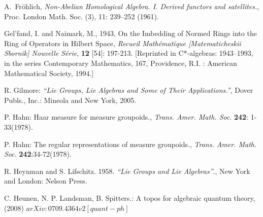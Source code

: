 \documentclass[12pt]{article}
\theoremstyle{plain}
\theoremstyle{definition}
\numberwithin{equation}{section}
\newcommand{\<}{{\langle}}
\begin{document}
\begin{thebibliography}{9}
A.~Fr{\"o}hlich, {\em Non-Abelian Homological Algebra. {I}.
{D}erived functors and satellites.\/}, Proc. London Math. Soc. (3), 11: 239--252 (1961).


Gel'fand, I. and Naimark, M., 1943, On the Imbedding of Normed Rings into the Ring of
Operators in Hilbert Space, {\em Recueil Math\'ematique [Matematicheskii Sbornik] Nouvelle S\'erie}, 
\textbf{12} [54]: 197-213. [Reprinted in C*-algebras: 1943--1993, in the series Contemporary 
Mathematics, 167,  Providence, R.I. : American Mathematical Society, 1994.]

R. Gilmore: \textit{``Lie Groups, Lie Algebras and Some of Their Applications.''},
Dover Publs., Inc.: Mineola and New York, 2005.

P. Hahn: Haar measure for measure groupoids., \textit{Trans. Amer. Math. Soc}. \textbf{242}: 1-33(1978).

P. Hahn: The regular representations of measure groupoids., \textit{Trans. Amer. Math. Soc}. \textbf{242}:34-72(1978).

R. Heynman and S. Lifschitz. 1958. \emph{``Lie Groups and Lie Algebras''}., New York and London: Nelson Press.

C. Heunen, N. P. Landsman, B. Spitters.: A topos for algebraic quantum theory, (2008) $arXiv:0709.4364v2 [quant-ph]$

\end{thebibliography}
\end{document}
